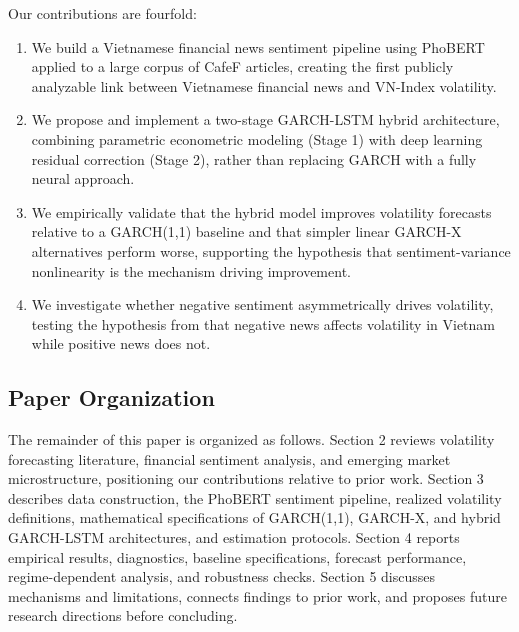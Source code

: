 Our contributions are fourfold:
\begin{enumerate}
    \item We build a Vietnamese financial news sentiment pipeline using PhoBERT applied to a large corpus of CafeF articles, creating the first publicly analyzable link between Vietnamese financial news and VN-Index volatility.
    \item We propose and implement a two-stage GARCH-LSTM hybrid architecture, combining parametric econometric modeling (Stage 1) with deep learning residual correction (Stage 2), rather than replacing GARCH with a fully neural approach.
    \item We empirically validate that the hybrid model improves volatility forecasts relative to a GARCH(1,1) baseline and that simpler linear GARCH-X alternatives perform worse, supporting the hypothesis that sentiment-variance nonlinearity is the mechanism driving improvement.
    \item We investigate whether negative sentiment asymmetrically drives volatility, testing the hypothesis from \citet{vu2023sentiments} that negative news affects volatility in Vietnam while positive news does not.
\end{enumerate}

\subsection{Paper Organization}

The remainder of this paper is organized as follows. Section 2 reviews volatility forecasting literature, financial sentiment analysis, and emerging market microstructure, positioning our contributions relative to prior work. Section 3 describes data construction, the PhoBERT sentiment pipeline, realized volatility definitions, mathematical specifications of GARCH(1,1), GARCH-X, and hybrid GARCH-LSTM architectures, and estimation protocols. Section 4 reports empirical results, diagnostics, baseline specifications, forecast performance, regime-dependent analysis, and robustness checks. Section 5 discusses mechanisms and limitations, connects findings to prior work, and proposes future research directions before concluding.
